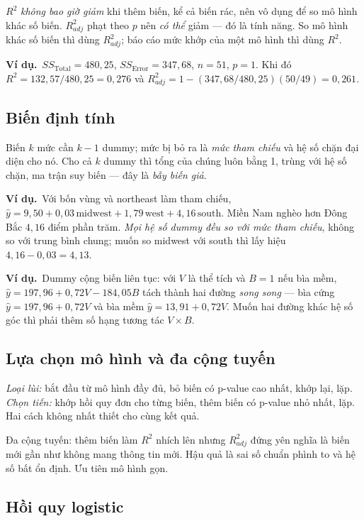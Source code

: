 \documentclass[11pt]{article}
\newcommand{\vd}{\textbf{Ví dụ.}\ }
\begin{document}
$R^2$ \emph{không bao giờ giảm} khi thêm biến, kể cả biến rác, nên vô dụng để so
mô hình khác số biến. $R^2_{adj}$ phạt theo $p$ nên \emph{có thể} giảm --- đó là
tính năng. So mô hình khác số biến thì dùng $R^2_{adj}$; báo cáo mức khớp của một
mô hình thì dùng $R^2$.

\vd $SS_{\text{Total}} = 480{,}25$, $SS_{\text{Error}} = 347{,}68$, $n=51$, $p=1$.
Khi đó $R^2 = 132{,}57/480{,}25 = 0{,}276$ và
$R^2_{adj} = 1 - (347{,}68/480{,}25)(50/49) = 0{,}261$.

\subsection*{Biến định tính}

Biến $k$ mức cần $k-1$ dummy; mức bị bỏ ra là \emph{mức tham chiếu} và hệ số chặn
đại diện cho nó. Cho cả $k$ dummy thì tổng của chúng luôn bằng 1, trùng với hệ số
chặn, ma trận suy biến --- đây là \emph{bẫy biến giả}.

\vd Với bốn vùng và northeast làm tham chiếu,
$\hat y = 9{,}50 + 0{,}03\,\text{midwest} + 1{,}79\,\text{west} + 4{,}16\,\text{south}$.
Miền Nam nghèo hơn Đông Bắc $4{,}16$ điểm phần trăm. \emph{Mọi hệ số dummy đều so
với mức tham chiếu}, không so với trung bình chung; muốn so midwest với south thì
lấy hiệu $4{,}16 - 0{,}03 = 4{,}13$.

\vd Dummy cộng biến liên tục: với $V$ là thể tích và $B=1$ nếu bìa mềm,
$\hat y = 197{,}96 + 0{,}72V - 184{,}05B$ tách thành hai đường \emph{song song} ---
bìa cứng $\hat y = 197{,}96 + 0{,}72V$ và bìa mềm $\hat y = 13{,}91 + 0{,}72V$.
Muốn hai đường khác hệ số góc thì phải thêm số hạng tương tác $V \times B$.

\subsection*{Lựa chọn mô hình và đa cộng tuyến}

\emph{Loại lùi:} bắt đầu từ mô hình đầy đủ, bỏ biến có p-value cao nhất, khớp lại,
lặp. \emph{Chọn tiến:} khớp hồi quy đơn cho từng biến, thêm biến có p-value nhỏ
nhất, lặp. Hai cách không nhất thiết cho cùng kết quả.

Đa cộng tuyến: thêm biến làm $R^2$ nhích lên nhưng $R^2_{adj}$ đứng yên nghĩa là
biến mới gần như không mang thông tin mới. Hậu quả là sai số chuẩn phình to và hệ
số bất ổn định. Ưu tiên mô hình gọn.

\subsection*{Hồi quy logistic}
\end{document}
